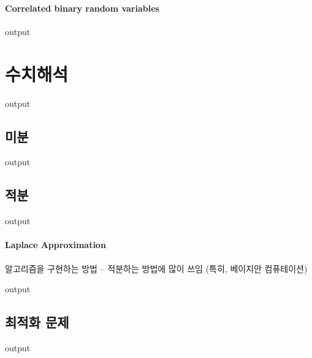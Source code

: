 \documentclass{book}
\begin{document}
\paragraph{Correlated binary random variables}
\begin{Schunk}
\begin{Soutput}
output
\end{Soutput}
\end{Schunk}

\section{수치해석}
\begin{Schunk}
\begin{Soutput}
output
\end{Soutput}
\end{Schunk}

\subsection{미분}
\begin{Schunk}
\begin{Soutput}
output
\end{Soutput}
\end{Schunk}

\subsection{적분}
\begin{Schunk}
\begin{Soutput}
output
\end{Soutput}
\end{Schunk}
\paragraph{Laplace Approximation} 알고리즘을 구현하는 방법 -- 적분하는 방법에 많이 쓰임 (특히, 베이지안 컴퓨테이션) 
\begin{Schunk}
\begin{Soutput}
output
\end{Soutput}
\end{Schunk}

\subsection{최적화 문제}
\begin{Schunk}
\begin{Soutput}
output
\end{Soutput}
\end{Schunk}
\end{document}
